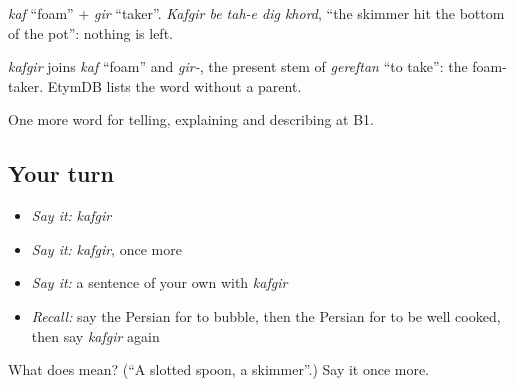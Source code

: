 \emph{kaf} \textquotedblleft{}foam\textquotedblright{} + \emph{gir} \textquotedblleft{}taker\textquotedblright{}. \emph{Kafgir be tah-e dig khord}, \textquotedblleft{}the skimmer hit the bottom of the pot\textquotedblright{}: nothing is left.

\begin{cousinweb}
\emph{kafgir} joins \emph{kaf} \textquotedblleft{}foam\textquotedblright{} and \emph{gir-}, the present stem of \emph{gereftan} \textquotedblleft{}to take\textquotedblright{}: the foam-taker. EtymDB lists the word without a parent.
\end{cousinweb}

\begin{grammarlens}[title={What you've built}]
One more word for telling, explaining and describing at B1.
\end{grammarlens}

\subsection*{Your turn}
\begin{itemize}
\raggedright
  \item \emph{Say it:} \emph{kafgir}
  \item \emph{Say it:} \emph{kafgir}, once more
  \item \emph{Say it:} a sentence of your own with \emph{kafgir}
  \item \emph{Recall:} say the Persian for to bubble, then the Persian for to be well cooked, then say \emph{kafgir} again
\end{itemize}

\begin{tcolorbox}[breakable,colback=teal!4,colframe=teal!35!black,title={Before you move on}]
What does  mean? (\textquotedblleft{}A slotted spoon, a skimmer\textquotedblright{}.) Say it once more.
\end{tcolorbox}
